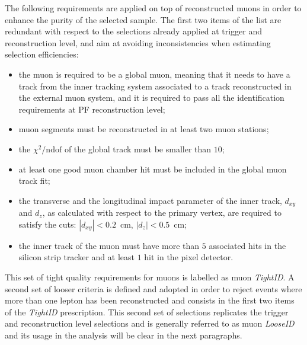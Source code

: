 The following requirements are applied on top of reconstructed muons in order to 
enhance the purity of the selected sample. The first two items of the list are redundant 
with respect to the selections already applied at trigger and reconstruction level,
and aim at avoiding inconsistencies when estimating selection efficiencies:
\begin{itemize}
\item the muon is required to be a global muon, meaning that it needs to have a 
  track from the inner tracking system associated to a track reconstructed in the 
  external muon system, and it is required to pass all the identification 
  requirements at PF reconstruction level;
\item muon segments must be reconstructed in at least 
  two muon stations;
\item the $\chi^{2}/\mathrm{ndof}$ of the global track must be smaller than $10$;
\item at least one good muon chamber hit must be included in the global muon track fit;
\item the transverse and the longitudinal impact parameter of 
  the inner track, $d_{xy}$ and $d_{z}$, as calculated with respect to 
  the primary vertex, are required to satisfy 
  the cuts: $|d_{xy}| < 0.2$~cm, $|d_{z}| < 0.5$~cm;
\item the inner track of the muon must have more than $5$ associated hits in the 
  silicon strip tracker and at least $1$ hit in the pixel detector.
\end{itemize}
This set of tight quality requirements for muons is labelled as muon 
\textit{TightID}. A second set of looser criteria is defined and 
adopted in order to reject events where more than one lepton has been reconstructed and 
consists in the first two items of the \textit{TightID} prescription.
This second set of selections replicates the trigger and reconstruction level 
selections and is generally referred to as muon \textit{LooseID} and its usage 
in the analysis will be clear in the next paragraphs.

